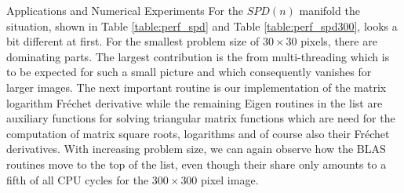 \begin{chapter}{Applications and Numerical Experiments}
For the $SPD(n)$ manifold the situation, shown in Table \ref{table:perf_spd} and Table \ref{table:perf_spd300}, looks a bit different at first. 
For the smallest problem size of $30\times 30$ pixels, there are dominating parts. The largest contribution is the from multi-threading which is to be expected
for such a small picture and which consequently vanishes for larger images. 
The next important routine is our implementation of the matrix logarithm Fr\'{e}chet derivative while the remaining Eigen routines in the
list are auxiliary functions for solving triangular matrix functions which are need for the computation of matrix square roots, logarithms and of course also their
Fr\'{e}chet derivatives. With increasing problem size, we can again observe how the BLAS routines move to the top of the list, even though their share only amounts 
to a fifth of all CPU cycles for the $300\times 300$ pixel image. \\

\begin{table}[h!]
\centering
\footnotesize
\setlength{\tabcolsep}{3pt}
\,
\caption[]{Share of total CPU cycles for IRLS minimization over $M=SPD(3)$
 Synthetic $SPD(3)$ , $30\times 30$
 Synthetic $SPD(3)$ , $100\times 100$
\label{table:perf_spd}
}
\end{table}



\end{chapter}
